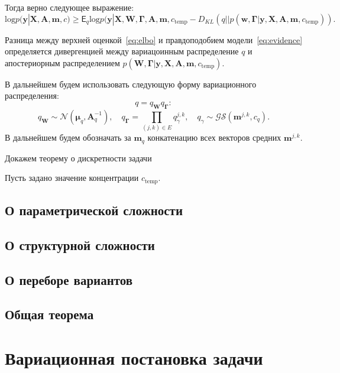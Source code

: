 \documentclass[12pt]{article}
\begin{document}
Тогда верно следующее выражение:
\begin{equation}
\label{eq:elbo}
    \text{log} p(\mathbf{y}|\mathbf{X},\mathbf{A},\mathbf{m}, c)  \geq \mathsf{E}_{q}\text{log} p(\mathbf{y}|\mathbf{X},\mathbf{W}, \boldsymbol{\Gamma}, \mathbf{A},\mathbf{m}, c_{\text{temp}} - {D_{KL}}(q||p(\mathbf{w}, \boldsymbol{\Gamma}|\mathbf{y}, \mathbf{X}, \mathbf{A},\mathbf{m}, c_{\text{temp}})).
\end{equation}

Разница между верхней оценкой~\eqref{eq:elbo} и правдоподобием модели~\eqref{eq:evidence} определяется дивергенцией между вариацоинным распределение $q$ и апостериорным распределением $p(\mathbf{W}, \boldsymbol{\Gamma}|\mathbf{y}, \mathbf{X}, \mathbf{A},\mathbf{m}, c_{\text{temp}})$. 

В дальнейшем будем использовать следующую форму вариационного распределения:
$$q = q_{\mathbf{W}}q_{\boldsymbol{\Gamma}}:$$
$$q_{\mathbf{W}} \sim \mathcal{N}(\boldsymbol{\mu}_q, \mathbf{A}^{-1}_q), \quad q_{\boldsymbol{\Gamma}} = \prod_{(j,k) \in E} q_\gamma^{j,k}, \quad q_\gamma \sim \mathcal{GS}( \mathbf{m}^{j,k}, c_q).$$
В дальнейшем будем обозначать за $\mathbf{m}_q$ конкатенацию всех векторов средних  $\mathbf{m}^{j,k}$.

Докажем теорему о дискретности задачи 

Пусть задано значение концентрации $c_{\text{temp}}$. 






\subsection{О параметрической сложности}

\subsection{О структурной сложности}

\subsection{О переборе вариантов}

\subsection{Общая теорема} 

\section{Вариационная постановка задачи}
\end{document}
